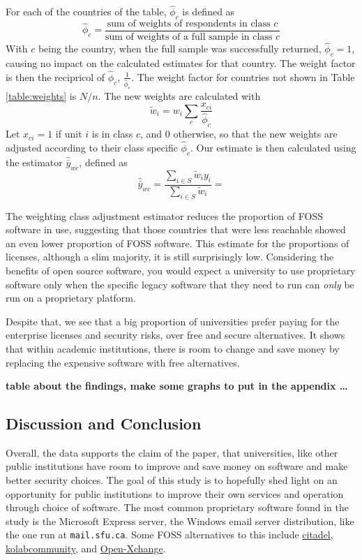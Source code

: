 \documentclass{article}
\theoremstyle{definition}
\begin{document}
\begin{flushleft}
\begin{multicols}{2}
For each of the countries of the table, $\hat{\phi}_c$ is defined as
$$
\hat{\phi}_c
=
\frac{
\textrm{sum of weights of respondents in class $c$}
}{
\textrm{sum of weights of a full sample in class $c$}
}
$$
With $c$ being the country, when the full sample was successfully returned,
$\hat{\phi}_c=1$, causing no impact on the calculated estimates for that country.
The weight factor is then the recipricol of $\hat{\phi}_c$, $\frac{1}{\hat{\phi}_c}$.
The weight factor for countries not shown in Table \ref{table:weights} is $N/n$.
The new weights are calculated with
$$
\tilde{w}_i
=
w_i
\sum_{c}
\frac{x_{ci}}{\hat{\phi}_c}
$$
Let $x_{ci}=1$ if unit $i$ is in class $c$, and $0$ otherwise, so that
the new weights are adjusted according to their class specific $\hat{\phi}_c$.
Our estimate is then calculated using the estimator $\hat{\bar{y}}_{wc}$,
defined as
$$
\hat{\bar{y}}_{wc}
=
\frac{
	\sum_{i \in S} \tilde{w}_iy_i
}{
	\sum_{i \in S} \tilde{w}_i
}
=
$$

The weighting class adjustment estimator reduces the proportion of FOSS software
in use, suggesting that those countries that were less reachable showed an even
lower proportion of FOSS software.
This estimate for the proportions of licenses, although a slim majority, it is still
surprisingly
low. Considering the benefits of open source software, you would expect a
university to use proprietary software only when the specific legacy software
that they need to run can \textit{only} be run on a proprietary platform.

Despite that, we see that a big proportion of universities prefer paying for the
enterprise licenses and security risks, over free and secure alternatives. It shows
that within academic institutions, there is room to change and save money by
replacing the expensive software with free alternatives.

\textbf{table about the findings, make some graphs to put in the appendix \dots}


\subsection{Discussion and Conclusion}
Overall, the data supports the claim of the paper, that universities,
like other public institutions have room to improve and save money on
software and make better security choices.
The goal of this study is to hopefully shed
light on an opportunity for public institutions to improve their own
services and operation through choice of software. The most common
proprietary software found in the study is the Microsoft Express
server, the Windows email server distribution, like the one run at
\texttt{mail.sfu.ca}. Some FOSS alternatives to this include
\href{https://www.citadel.org/}{citadel},
\href{https://kolab.org/}{kolabcommunity}, and
\href{https://www.open-xchange.com/}{Open-Xchange}.


\end{multicols}
\end{flushleft}
\end{document}
